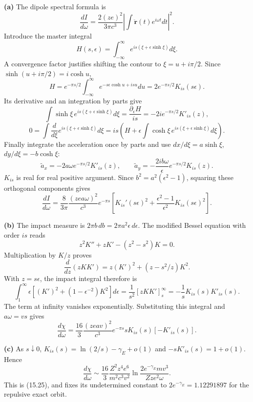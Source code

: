 \medskip\noindent\textbf{(a)} The dipole spectral formula is
\[
\frac{dI}{d\omega}=\frac{2(ze)^2}{3\pi c^3}
 \left|\int\ddot{\mathbf r}(t)e^{i\omega t}dt\right|^2.
\]
Introduce the master integral
\[
H(s,\epsilon)=\int_{-\infty}^{\infty}
 e^{is(\xi+\epsilon\sinh\xi)}d\xi.
\]
A convergence factor justifies shifting the contour to
$\xi=u+i\pi/2$.  Since $\sinh(u+i\pi/2)=i\cosh u$,
\[
H=e^{-\pi s/2}\int_{-\infty}^{\infty}
 e^{-s\epsilon\cosh u+isu}du
=2e^{-\pi s/2}K_{is}(s\epsilon).
\]
Its derivative and an integration by parts give
\[
\int\sinh\xi\,e^{is(\xi+\epsilon\sinh\xi)}d\xi
=\frac{\partial_\epsilon H}{is}=-2i e^{-\pi s/2}K'_{is}(z),
\]
\[
0=\int\frac d{d\xi}e^{is(\xi+\epsilon\sinh\xi)}d\xi
=is\left(H+\epsilon\int\cosh\xi\,e^{is(\xi+\epsilon\sinh\xi)}d\xi\right).
\]
Finally integrate the acceleration once by parts and use
$dx/d\xi=a\sinh\xi$, $dy/d\xi=-b\cosh\xi$:
\[
\widetilde a_x=-2a\omega e^{-\pi s/2}K'_{is}(z),\qquad
\widetilde a_y=-\frac{2ib\omega}{\epsilon}e^{-\pi s/2}K_{is}(z).
\]
$K_{is}$ is real for real positive argument.  Since
$b^2=a^2(\epsilon^2-1)$, squaring these orthogonal components gives
\[
\boxed{\frac{dI}{d\omega}
=\frac8{3\pi}\frac{(zea\omega)^2}{c^3}e^{-\pi s}
 \left[K_{is}'(s\epsilon)^2+
 \frac{\epsilon^2-1}{\epsilon^2}K_{is}(s\epsilon)^2\right].}
\]

\medskip\noindent\textbf{(b)} The impact measure is
$2\pi b\,db=2\pi a^2\epsilon\,d\epsilon$.
The modified Bessel equation with order $is$ reads
\[
z^2K''+zK'-(z^2-s^2)K=0.
\]
Multiplication by $K/z$ proves
\[
\frac d{dz}(zKK')=z(K')^2+(z-s^2/z)K^2.
\]
With $z=s\epsilon$, the impact integral therefore is
\[
\int_1^\infty\epsilon
 \left[(K')^2+(1-\epsilon^{-2})K^2\right]d\epsilon
=\frac1{s^2}[zKK']_s^\infty
=-\frac1sK_{is}(s)K'_{is}(s).
\]
The term at infinity vanishes exponentially.  Substituting this
integral and $a\omega=vs$ gives
\[
\boxed{\frac{d\chi}{d\omega}
=\frac{16}3\frac{(zeav)^2}{c^3}e^{-\pi s}
 sK_{is}(s)[-K'_{is}(s)].}
\]

\medskip\noindent\textbf{(c)} As $s\downarrow0$,
$K_{is}(s)=\ln(2/s)-\gamma_E+o(1)$ and
$-sK'_{is}(s)=1+o(1)$.  Hence
\[
\boxed{\frac{d\chi}{d\omega}\sim
\frac{16}3\frac{Z^2z^4e^6}{m^2c^3v^2}
 \ln\frac{2e^{-\gamma_E}mv^3}{Zze^2\omega}.}
\]
This is (15.25), and fixes its undetermined constant to
$2e^{-\gamma_E}=1.12291897$ for the repulsive exact orbit.

